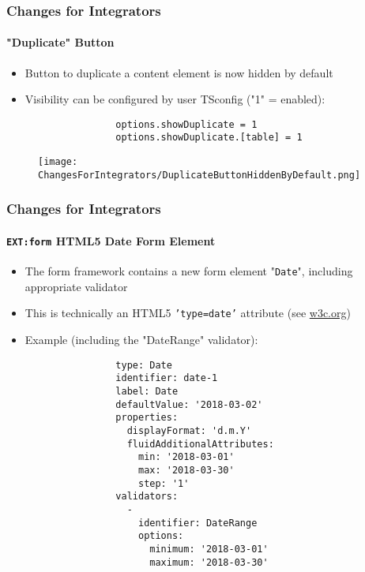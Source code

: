 \begin{frame}[fragile]
	\frametitle{Changes for Integrators}
	\framesubtitle{"Duplicate" Button}

	\lstset{basicstyle=\smaller\ttfamily}

	\begin{itemize}
		\item Button to duplicate a content element is now hidden by default
		\item Visibility can be configured by user TSconfig ("1" = enabled):

			\begin{lstlisting}
				options.showDuplicate = 1
				options.showDuplicate.[table] = 1
			\end{lstlisting}

	\end{itemize}
	\vspace{-0.5cm}
	\begin{figure}
		\texttt{[image: ChangesForIntegrators/DuplicateButtonHiddenByDefault.png]}
	\end{figure}

\end{frame}


\begin{frame}[fragile]
	\frametitle{Changes for Integrators}
	\framesubtitle{\texttt{EXT:form} HTML5 Date Form Element}

	\lstset{basicstyle=\tiny\ttfamily}

	\begin{itemize}
		\item The form framework contains a new form element "\texttt{Date}",
			including appropriate validator
		\item This is technically an HTML5 \texttt{'type=date'} attribute
			(see \href{https://www.w3.org/TR/2011/WD-html-markup-20110405/input.date.html}{w3c.org})
		\item Example (including the "DateRange" validator):

			\begin{lstlisting}
				type: Date
				identifier: date-1
				label: Date
				defaultValue: '2018-03-02'
				properties:
				  displayFormat: 'd.m.Y'
				  fluidAdditionalAttributes:
				    min: '2018-03-01'
				    max: '2018-03-30'
				    step: '1'
				validators:
				  -
				    identifier: DateRange
				    options:
				      minimum: '2018-03-01'
				      maximum: '2018-03-30'
			\end{lstlisting}

	\end{itemize}

\end{frame}

